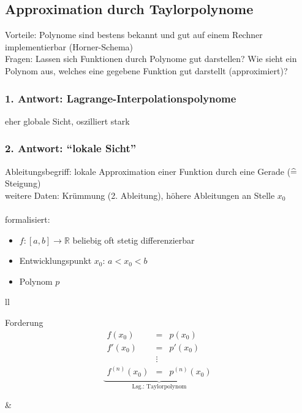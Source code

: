 
\subsection{Approximation durch Taylorpolynome}

Vorteile: Polynome sind bestens bekannt und gut auf einem Rechner implementierbar (Horner-Schema)\\
Fragen: Lassen sich Funktionen durch Polynome gut darstellen? Wie sieht ein Polynom aus, welches eine gegebene Funktion gut darstellt (approximiert)?

\subsubsection*{1. Antwort: Lagrange-Interpolationspolynome}


eher globale Sicht, oszilliert stark

\subsubsection*{2. Antwort: "`lokale Sicht"'}

Ableitungsbegriff: lokale Approximation einer Funktion durch eine Gerade ($\mathrel{\widehat{=}}$ Steigung)\\
weitere Daten: Krümmung (2. Ableitung), höhere Ableitungen an Stelle $x_0$\\\\
formalisiert:
\begin{itemize}
  \item $f: [a,b] \to \mathbb{R}$ beliebig oft stetig differenzierbar
  \item Entwicklungspunkt $x_0$: $a < x_0 < b$
  \item Polynom $p$
\end{itemize}
\noindent
\begin{tabular}{ll}
  \begin{minipage}[b]{.5\textwidth}
    Forderung
    \[
      \underbrace{\begin{array}{rcl}
        f(x_0) &=& p(x_0) \\
        f'(x_0) &=& p'(x_0) \\
        &\vdots& \\
        f^{(n)}(x_0) &=& p^{(n)}(x_0)
      \end{array}}_{\text{Lsg.: Taylorpolynom}}
    \]
  \end{minipage} &
\end{tabular}

